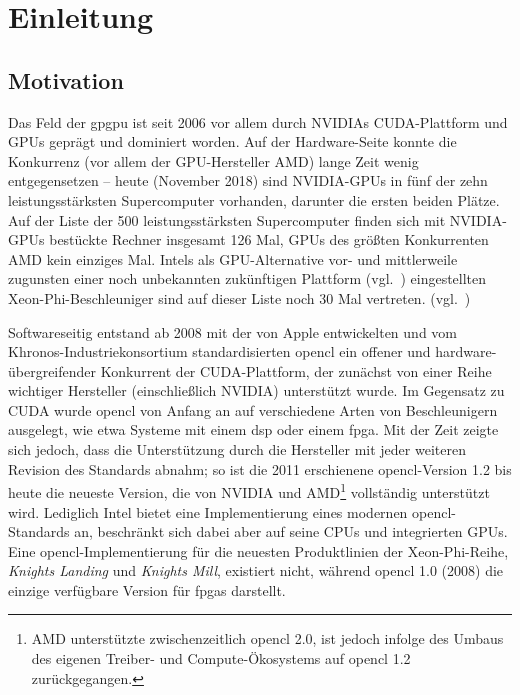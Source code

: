 \section{Einleitung}
\label{einleitung}

\subsection{Motivation}
\label{einleitung:motivation}

Das Feld der \gls{gpgpu} ist seit 2006 vor allem durch NVIDIAs CUDA-Plattform
und GPUs geprägt und dominiert worden. Auf der Hardware-Seite konnte die
Konkurrenz (vor allem der GPU-Hersteller AMD) lange Zeit wenig entgegensetzen
-- heute (November 2018) sind NVIDIA-GPUs in fünf der zehn leistungsstärksten
Supercomputer vorhanden, darunter die ersten beiden Plätze. Auf der Liste der
500 leistungsstärksten Supercomputer finden sich mit NVIDIA-GPUs bestückte
Rechner insgesamt 126 Mal, GPUs des größten Konkurrenten AMD kein einziges Mal.
Intels als GPU-Alternative vor- und mittlerweile zugunsten einer noch
unbekannten zukünftigen Plattform (vgl.~\cite{intel2017}) eingestellten
Xeon-Phi-Beschleuniger sind auf dieser Liste noch 30 Mal vertreten.
(vgl.~\cite{top500})

Softwareseitig entstand ab 2008 mit der von Apple entwickelten und vom
Khronos-Industriekonsortium standardisierten \gls{opencl} ein offener und
hardware-übergreifender Konkurrent der CUDA-Plattform, der zunächst von einer
Reihe wichtiger Hersteller (einschließlich NVIDIA) unterstützt wurde. Im 
Gegensatz zu CUDA wurde \gls{opencl} von Anfang an auf verschiedene Arten von
Beschleunigern ausgelegt, wie etwa Systeme mit einem \gls{dsp} oder einem
\gls{fpga}. Mit der Zeit zeigte sich jedoch, dass die Unterstützung durch die
Hersteller mit jeder weiteren Revision des Standards abnahm; so ist die 2011
erschienene \gls{opencl}-Version 1.2 bis heute die neueste Version, die von
NVIDIA und AMD\footnote{AMD unterstützte zwischenzeitlich \gls{opencl} 2.0, ist
jedoch infolge des Umbaus des eigenen Treiber- und Compute-Ökosystems auf
\gls{opencl} 1.2 zurückgegangen.} vollständig unterstützt wird. Lediglich Intel
bietet eine Implementierung eines modernen \gls{opencl}-Standards an, beschränkt
sich dabei aber auf seine CPUs und integrierten GPUs. Eine
\gls{opencl}-Implementierung für die neuesten Produktlinien der Xeon-Phi-Reihe,
\textit{Knights Landing} und \textit{Knights Mill}, existiert nicht, während
\gls{opencl} 1.0 (2008) die einzige verfügbare Version für \gls{fpga}s
darstellt.

